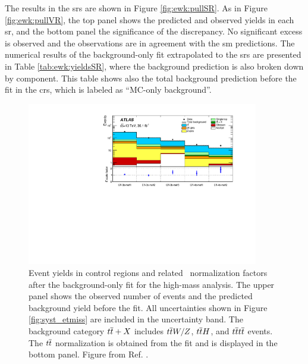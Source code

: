 The results in the \glspl{sr} are shown in Figure \ref{fig:ewk:pullSR}. As in Figure \ref{fig:ewk:pullVR}, the top panel shows the 
predicted and observed yields in each \gls{sr}, and the bottom panel the significance of the discrepancy. 
No significant excess is observed and the observations are in agreement with the \gls{sm} predictions. 
The numerical results of the background-only fit extrapolated to the \glspl{sr} are presented in Table \ref{tab:ewk:yieldsSR},
where the background prediction is also broken down by component. 
This table shows also the total background prediction before the fit in the \glspl{cr}, which is labeled as ``MC-only background''.


\begin{figure}[htbp]
	\centering
	\includegraphics[width=0.9\textwidth]{figures/ewk_prod/etmiss_results/histpull_pulls_in_CR_qcdStrong}
	\caption{Event yields in control regions and related \ttbar\
          normalization factors after the background-only fit for
          the high-mass analysis. The upper panel shows 
		the observed number of events and the predicted background yield before the fit.
		All uncertainties  shown in Figure \ref{fig:syst_etmiss} are included in the uncertainty band. The background category $t\overline{t}+X$ includes $t\overline{t} W/Z$, $t\overline{t} H$, and $t\overline{t} t\overline{t}$ events.  
		The $t\overline{t}$ normalization is obtained from the fit
                and is displayed in the bottom panel. Figure from Ref. \cite{Aaboud:2018htj}.
	} 
	\label{fig:ewk:pullCR}
\end{figure}


